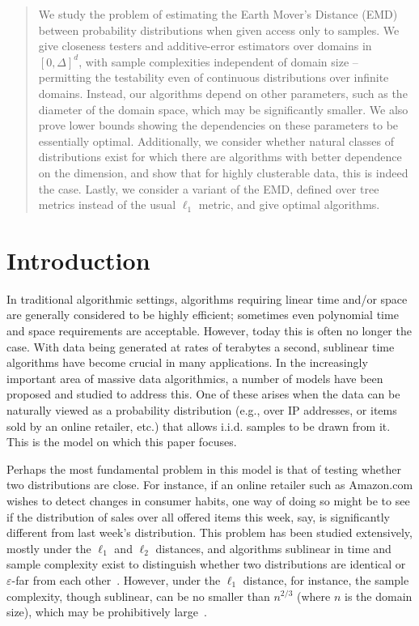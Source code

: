 \documentclass[11pt]{article}
\newcommand{\eps}{\varepsilon}
\begin{document}
\providecommand{\norm}[1]{\lVert #1 \rVert}
\newcommand{\embed}{{\rm Embed}}
\newcommand{\qembed}{\mbox{$q$-Embed}}
\newcommand{\calh}{{\cal H}}
\newcommand{\lp}{{\rm LP}}
 \maketitle

\begin{abstract}
	We study the problem of estimating the Earth Mover's Distance (EMD) between
	probability distributions when given access only to samples. We give closeness
	testers and additive-error estimators over domains in $[0,\Delta]^d$, with
	sample complexities independent of domain size -- permitting the testability
	even of continuous distributions over infinite domains. Instead, our algorithms depend on
	other parameters, such as the diameter of the domain space, which may be
	significantly smaller. We also prove lower bounds showing the dependencies
	on these parameters to be essentially optimal. Additionally, we consider whether
	natural classes of distributions exist for which there are
	algorithms with better dependence on the dimension, and show that for
	highly clusterable data, this is indeed the case. Lastly, we consider a variant
	of the EMD, defined over tree metrics instead of the usual $\ell_1$ metric, and
	give optimal algorithms.
\end{abstract}
\section{Introduction}

In traditional algorithmic settings, algorithms requiring linear time and/or space
are generally considered to be highly efficient; sometimes even
polynomial time and space requirements are acceptable. However, today this is often no
longer the case. With data being generated at rates of terabytes a second,
sublinear time algorithms have become crucial in many applications. In the increasingly important
area of massive data algorithmics, a number of models have been proposed and
studied to address this. One of these arises when the data can be naturally viewed
as a probability distribution (e.g., over IP addresses, or items sold by an online
retailer, etc.) that allows i.i.d. samples to be drawn from it. This is the model
on which this paper focuses.

Perhaps the most fundamental problem in this model is that of testing whether two
distributions are close. For instance, if an online retailer such as Amazon.com
wishes to detect changes in consumer habits, one way of doing so might be to see if
the distribution of sales over all offered items this week, say, is significantly
different from last week's distribution. This problem has been studied extensively, mostly
under the $\ell_1$ and $\ell_2$ distances, and algorithms sublinear in time and
sample complexity exist to distinguish
whether two distributions are identical or $\eps$-far from each other~\cite{L1tester,GR,valiant}.
However, under the $\ell_1$ distance, for instance, the sample complexity, though sublinear, can be no
smaller than $n^{2/3}$ (where $n$ is the domain size), which may be
prohibitively large~\cite{L1tester,valiant}.
\end{document}
